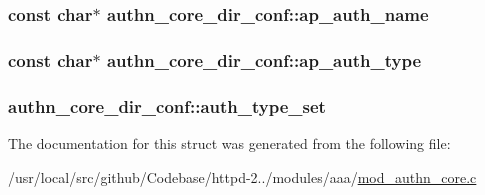 \subsubsection[{\texorpdfstring{ap\+\_\+auth\+\_\+name}{ap_auth_name}}]{\setlength{\rightskip}{0pt plus 5cm}const char$\ast$ authn\+\_\+core\+\_\+dir\+\_\+conf\+::ap\+\_\+auth\+\_\+name}\hypertarget{structauthn__core__dir__conf_a67bb6e403a07e6b7b1a1dd1f3faa7d5b}{}\label{structauthn__core__dir__conf_a67bb6e403a07e6b7b1a1dd1f3faa7d5b}
\subsubsection[{\texorpdfstring{ap\+\_\+auth\+\_\+type}{ap_auth_type}}]{\setlength{\rightskip}{0pt plus 5cm}const char$\ast$ authn\+\_\+core\+\_\+dir\+\_\+conf\+::ap\+\_\+auth\+\_\+type}\hypertarget{structauthn__core__dir__conf_aebea385736fd41ea26a6b19e598cc089}{}\label{structauthn__core__dir__conf_aebea385736fd41ea26a6b19e598cc089}
\subsubsection[{\texorpdfstring{auth\+\_\+type\+\_\+set}{auth_type_set}}]{ authn\+\_\+core\+\_\+dir\+\_\+conf\+::auth\+\_\+type\+\_\+set}\hypertarget{structauthn__core__dir__conf_a76b23000c23e867a4877020207322c6a}{}\label{structauthn__core__dir__conf_a76b23000c23e867a4877020207322c6a}


The documentation for this struct was generated from the following file\+:\begin{DoxyCompactItemize}
\item 
/usr/local/src/github/\+Codebase/httpd-\/2../modules/aaa/\hyperlink{mod__authn__core_8c}{mod\+\_\+authn\+\_\+core.\+c}\end{DoxyCompactItemize}
